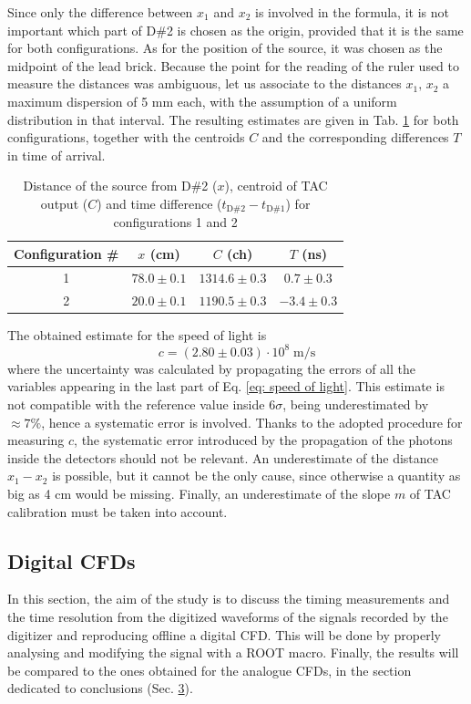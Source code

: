 \documentclass[a4paper]{article}
\begin{document}
Since only the difference between $x_1$ and $x_2$ is involved in the formula, it is not important which part of D\#2 is chosen as the origin, provided that it is the same for both configurations. 
As for the position of the source, it was chosen as the midpoint of the lead brick. Because the point for the reading of the ruler used to measure the distances was ambiguous, let us associate to the distances $x_1,\,x_2$ a maximum dispersion of 5 mm each, with the assumption of a uniform distribution in that interval. 
The resulting estimates are given in Tab. \ref{tab: speed of light} for both configurations, together with the centroids $C$ and the corresponding differences $T$ in time of arrival.
\begin{table}[H]
    \centering \captionsetup{width=.70\linewidth}
    \begin{tabular}{|c|ccc|}
    \hline
  Configuration \#& $x$ (cm) & $C $ (ch)  & $T$ (ns)\\
    \hline
    1&  $78.0\pm0.1$ &   $1314.6\pm0.3$& $0.7\pm0.3$ \\
    2& $20.0\pm0.1$ & $1190.5\pm0.3$  & $-3.4\pm0.3$ \\
    \hline
    \end{tabular}
    \caption{Distance of the source from D\#2 ($x$), centroid of TAC output ($C$) and time difference ($t_{\mathrm{D\#2}}-t_{\mathrm{D\#1}}$) for configurations 1 and 2}
    \label{tab: speed of light}
\end{table}
The obtained estimate for the speed of light is
\[c=(2.80\pm0.03)\cdot10^8\;\mathrm{m/s}\]
where the uncertainty was calculated by propagating the errors of all the variables appearing in the last part of Eq. \eqref{eq: speed of light}. 
This estimate is not compatible with the reference value inside $6\sigma$, being underestimated by $\approx7\%$, hence a systematic error is involved. 
Thanks to the adopted procedure for measuring $c$, the systematic error introduced by the propagation of the photons inside the detectors should not be relevant. 
An underestimate of the distance $x_1-x_2$ is possible, but it cannot be the only cause, since otherwise a quantity as big as 4 cm would be missing.
Finally, an underestimate of the slope $m$ of TAC calibration must be taken into account.


\subsection{Digital CFDs} 
In this section, the aim of the study is to discuss the 
timing measurements and the time resolution from the digitized waveforms of the signals recorded by the digitizer and reproducing offline a digital CFD. This will be done by properly analysing and modifying the signal with a ROOT macro. Finally, the results will be compared to the ones obtained for the analogue CFDs, in the section dedicated to conclusions (Sec. \hyperlink{3}{3}).
\end{document}
